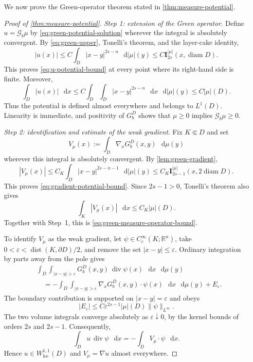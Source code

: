 \documentclass[10pt,a4paper]{amsart}
\numberwithin{equation}{section}
\newcommand{\R}{\mathbb R}
\newcommand{\I}{\mathbf I}
\newcommand{\differential}{\mathop{}\!\mathrm d}
\DeclareMathOperator{\divergence}{div}
\newcommand{\rev}[1]{#1}
\begin{document}
\rev{We now prove the Green-operator theorem stated in
\cref{thm:measure-potential}.}


\begin{proof}[Proof of \cref{thm:measure-potential}]
\begingroup
\emph{Step 1: extension of the Green operator.}
Define $u=\mathcal G_b\mu$ by \eqref{eq:green-potential-solution} wherever
the integral is absolutely convergent.  By \eqref{eq:green-upper}, Tonelli's
theorem, and the layer-cake identity,
\[
 |u(x)|\le C\int_D|x-y|^{2s-n}\,\differential|\mu|(y)
 \le C\I_{2s}^{|\mu|}(x,\operatorname{diam}D).
\]
This proves \eqref{eq:u-potential-bound} at every point where its right-hand
side is finite.  Moreover,
\[
 \int_D|u(x)|\,\differential x
 \le C\int_D\int_D|x-y|^{2s-n}\,\differential x\,
       \differential|\mu|(y)
 \le C|\mu|(D).
\]
Thus the potential is defined almost everywhere and belongs to $L^1(D)$.
Linearity is immediate, and positivity of $G_b^D$ shows that
$\mu\ge0$ implies $\mathcal G_b\mu\ge0$.

\emph{Step 2: identification and estimate of the weak gradient.}
Fix $K\Subset D$ and set
\[
 V_\mu(x):=\int_D\nabla_xG_b^D(x,y)\,\differential\mu(y)
\]
wherever this integral is absolutely convergent.  By
\cref{lem:green-gradient},
\[
 |V_\mu(x)|
 \le C_K\int_D|x-y|^{2s-n-1}\,\differential|\mu|(y)
 \le C_K\I_{2s-1}^{|\mu|}(x,2\operatorname{diam}D).
\]
This proves \eqref{eq:gradient-potential-bound}.  Since $2s-1>0$, Tonelli's
theorem also gives
\[
 \int_K|V_\mu(x)|\,\differential x\le C_K|\mu|(D).
\]
Together with Step~1, this is \eqref{eq:green-measure-operator-bound}.

To identify $V_\mu$ as the weak gradient, let
$\psi\in C_c^\infty(K;\R^n)$, take
$0<\varepsilon<\operatorname{dist}(K,\partial D)/2$, and remove the set
$|x-y|\le\varepsilon$.  Ordinary integration by parts away from the pole
gives
\begin{align*}
 &\int_D\int_{|x-y|>\varepsilon}
 G_b^D(x,y)\,\divergence\psi(x)
 \,\differential x\,\differential\mu(y)\\
 &\quad=-\int_D\int_{|x-y|>\varepsilon}
 \nabla_xG_b^D(x,y)\cdot\psi(x)
 \,\differential x\,\differential\mu(y)+E_\varepsilon.
\end{align*}
The boundary contribution is supported on $|x-y|=\varepsilon$ and obeys
\[
 |E_\varepsilon|
 \le C\varepsilon^{2s-1}|\mu|(D)\|\psi\|_{L^\infty}.
\]
The two volume integrals converge absolutely as
$\varepsilon\downarrow0$, by the kernel bounds of orders $2s$ and $2s-1$.
Consequently,
\[
 \int_Du\,\divergence\psi\,\differential x
 =-\int_DV_\mu\cdot\psi\,\differential x.
\]
Hence $u\in W^{1,1}_{\mathrm{loc}}(D)$ and
$V_\mu=\nabla u$ almost everywhere.


\end{proof}
\end{document}
